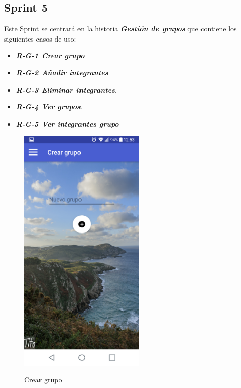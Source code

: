\subsection{Sprint 5}
Este Sprint se centrará en la historia \textbf{\textit{Gestión de grupos}} que contiene los siguientes casos de uso:
\begin{itemize}
\item\textbf{ \textit{R-G-1 Crear grupo}}
\item\textbf{\textit{ R-G-2 Añadir integrantes}}
\item \textbf{\textit{R-G-3 Eliminar integrantes}},
\item \textbf{\textit{R-G-4 Ver grupos}}.
\item \textbf{\textit{R-G-5 Ver integrantes grupo}}
\end{itemize}
\begin{figure}[htbp]
\begin{minipage}[b]{0.5\linewidth} %
\centering
\includegraphics[width=6cm]{capturamovil/creargrupo.png}
 \label{figura1}
\caption{Crear grupo}


\end{minipage}
\end{figure}
